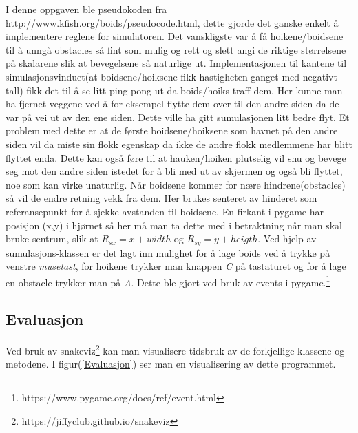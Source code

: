 {I denne oppgaven ble pseudokoden fra \url{http://www.kfish.org/boids/pseudocode.html}, dette gjorde det ganske enkelt å implementere reglene for simulatoren. Det vanskligste var å få hoikene/boidsene til å unngå obstacles så fint som mulig og rett og slett angi de riktige størrelsene på skalarene slik at bevegelsene så naturlige ut. Implementasjonen til kantene til simulasjonsvinduet(at boidsene/hoiksene fikk hastigheten ganget med negativt tall) fikk det til å se litt ping-pong ut da boids/hoiks traff dem. Her kunne man ha fjernet veggene ved å for eksempel flytte dem over til den andre siden da de var på vei ut av den ene siden. Dette ville ha gitt sumulasjonen litt bedre flyt. Et problem med dette er at de første boidsene/hoiksene som havnet på den andre siden vil da miste sin flokk egenskap da ikke de andre flokk medlemmene har blitt flyttet enda. Dette kan også føre til at hauken/hoiken plutselig vil snu og bevege seg mot den andre siden istedet for å bli med ut av skjermen og også bli flyttet, noe som kan virke unaturlig. Når boidsene kommer for nære hindrene(obstacles) så vil de endre retning vekk fra dem. Her brukes senteret av hinderet som referansepunkt for å sjekke avstanden til boidsene. En firkant i pygame har posisjon (x,y) i hjørnet så her må man ta dette med i betraktning når man skal bruke sentrum, slik at $R_{sx} = x + width$ og $R_{sy} = y + heigth$. Ved hjelp av sumulasjons-klassen er det lagt inn mulighet for å lage boids ved å trykke på venstre \emph{musetast}, for hoikene trykker man knappen \emph{C} på tastaturet og for å lage en obstacle trykker man på \emph{A}. Dette ble gjort ved bruk av events i pygame.\footnote{https://www.pygame.org/docs/ref/event.html} 


\subsection{Evaluasjon}

Ved bruk av snakeviz\footnote{https://jiffyclub.github.io/snakeviz} kan man visualisere tidsbruk av de forkjellige klassene og metodene. I figur(\ref{Evaluasjon}) ser man en visualisering av dette programmet.

}
